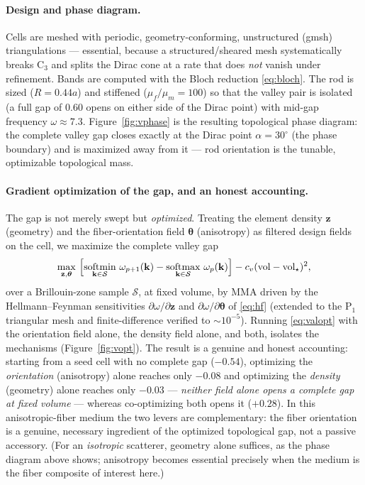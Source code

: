 \documentclass[11pt]{article}
\DeclareMathOperator{\softmax}{softmax}
\DeclareMathOperator{\softmin}{softmin}
\begin{document}
\paragraph{Design and phase diagram.}
Cells are meshed with periodic, geometry-conforming, unstructured (gmsh)
triangulations --- essential, because a structured/sheared mesh systematically
breaks C$_3$ and splits the Dirac cone at a rate that does \emph{not} vanish
under refinement. Bands are computed with the Bloch reduction \eqref{eq:bloch}.
The rod is sized ($R=0.44a$) and stiffened ($\mu_f/\mu_m=100$) so that the
valley pair is isolated (a full gap of $0.60$ opens on either side of the Dirac
point) with mid-gap frequency $\omega\!\approx\!7.3$. Figure~\ref{fig:vphase}
is the resulting topological phase diagram: the complete valley gap closes
exactly at the Dirac point $\alpha=30^\circ$ (the phase boundary) and is
maximized away from it --- rod orientation is the tunable, optimizable
topological mass.

\paragraph{Gradient optimization of the gap, and an honest accounting.}
The gap is not merely swept but \emph{optimized}. Treating the element density
$\mathbf z$ (geometry) and the fiber-orientation field $\bm\theta$ (anisotropy)
as filtered design fields on the cell, we maximize the complete valley gap
\begin{equation}
  \max_{\mathbf z,\bm\theta}\ \Bigl[\softmin_{\mathbf k\in\mathcal S}\,
  \omega_{p+1}(\mathbf k)-\softmax_{\mathbf k\in\mathcal S}\,\omega_{p}
  (\mathbf k)\Bigr]-c_v(\text{vol}-\text{vol}_\star)^2,
  \label{eq:valopt}
\end{equation}
over a Brillouin-zone sample $\mathcal S$, at fixed volume, by MMA driven by the
Hellmann--Feynman sensitivities $\partial\omega/\partial\mathbf z$ and
$\partial\omega/\partial\bm\theta$ of \eqref{eq:hf} (extended to the P$_1$
triangular mesh and finite-difference verified to $\sim\!10^{-5}$). Running
\eqref{eq:valopt} with the orientation field alone, the density field alone, and
both, isolates the mechanisms (Figure~\ref{fig:vopt}). The result is a genuine
and honest accounting: starting from a seed cell with no complete gap
($-0.54$), optimizing the \emph{orientation} (anisotropy) alone reaches only
$-0.08$ and optimizing the \emph{density} (geometry) alone reaches only $-0.03$
--- \emph{neither field alone opens a complete gap at fixed volume} --- whereas
co-optimizing both opens it ($+0.28$). In this anisotropic-fiber medium the two
levers are complementary: the fiber orientation is a genuine, necessary
ingredient of the optimized topological gap, not a passive accessory. (For an
\emph{isotropic} scatterer, geometry alone suffices, as the phase diagram
above shows; anisotropy becomes essential precisely when the medium is the
fiber composite of interest here.)
\end{document}
